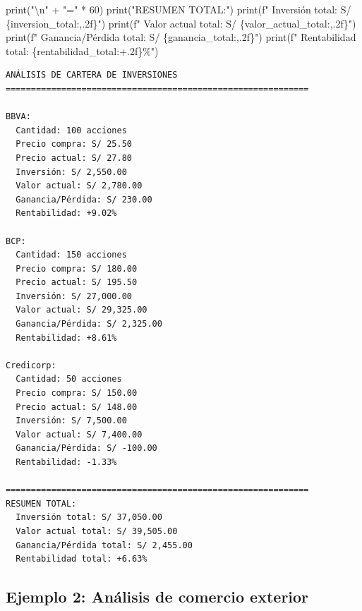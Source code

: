 \documentclass[
  doc,
  floatsintext,
  longtable,
  a4paper,
  nolmodern,
  notxfonts,
  notimes,
  12pt,
  colorlinks=true,linkcolor=blue,citecolor=blue,urlcolor=blue]{apa7}
\newenvironment{Shaded}{\begin{snugshade}}{\end{snugshade}}
\newcommand{\BuiltInTok}[1]{\textcolor[rgb]{0.00,0.23,0.31}{#1}}
\newcommand{\CharTok}[1]{\textcolor[rgb]{0.13,0.47,0.30}{#1}}
\newcommand{\DecValTok}[1]{\textcolor[rgb]{0.68,0.00,0.00}{#1}}
\newcommand{\NormalTok}[1]{\textcolor[rgb]{0.00,0.23,0.31}{#1}}
\newcommand{\OperatorTok}[1]{\textcolor[rgb]{0.37,0.37,0.37}{#1}}
\newcommand{\SpecialCharTok}[1]{\textcolor[rgb]{0.37,0.37,0.37}{#1}}
\newcommand{\SpecialStringTok}[1]{\textcolor[rgb]{0.13,0.47,0.30}{#1}}
\newcommand{\StringTok}[1]{\textcolor[rgb]{0.13,0.47,0.30}{#1}}
\begin{document}
\begin{Shaded}
\begin{Highlighting}[]
\BuiltInTok{print}\NormalTok{(}\StringTok{"}\CharTok{\textbackslash{}n}\StringTok{"} \OperatorTok{+} \StringTok{"="} \OperatorTok{*} \DecValTok{60}\NormalTok{)}
\BuiltInTok{print}\NormalTok{(}\StringTok{"RESUMEN TOTAL:"}\NormalTok{)}
\BuiltInTok{print}\NormalTok{(}\SpecialStringTok{f"  Inversión total: S/ }\SpecialCharTok{\{}\NormalTok{inversion\_total}\SpecialCharTok{:,.2f\}}\SpecialStringTok{"}\NormalTok{)}
\BuiltInTok{print}\NormalTok{(}\SpecialStringTok{f"  Valor actual total: S/ }\SpecialCharTok{\{}\NormalTok{valor\_actual\_total}\SpecialCharTok{:,.2f\}}\SpecialStringTok{"}\NormalTok{)}
\BuiltInTok{print}\NormalTok{(}\SpecialStringTok{f"  Ganancia/Pérdida total: S/ }\SpecialCharTok{\{}\NormalTok{ganancia\_total}\SpecialCharTok{:,.2f\}}\SpecialStringTok{"}\NormalTok{)}
\BuiltInTok{print}\NormalTok{(}\SpecialStringTok{f"  Rentabilidad total: }\SpecialCharTok{\{}\NormalTok{rentabilidad\_total}\SpecialCharTok{:+.2f\}}\SpecialStringTok{\%"}\NormalTok{)}
\end{Highlighting}
\end{Shaded}

\begin{verbatim}
ANÁLISIS DE CARTERA DE INVERSIONES
============================================================

BBVA:
  Cantidad: 100 acciones
  Precio compra: S/ 25.50
  Precio actual: S/ 27.80
  Inversión: S/ 2,550.00
  Valor actual: S/ 2,780.00
  Ganancia/Pérdida: S/ 230.00
  Rentabilidad: +9.02%

BCP:
  Cantidad: 150 acciones
  Precio compra: S/ 180.00
  Precio actual: S/ 195.50
  Inversión: S/ 27,000.00
  Valor actual: S/ 29,325.00
  Ganancia/Pérdida: S/ 2,325.00
  Rentabilidad: +8.61%

Credicorp:
  Cantidad: 50 acciones
  Precio compra: S/ 150.00
  Precio actual: S/ 148.00
  Inversión: S/ 7,500.00
  Valor actual: S/ 7,400.00
  Ganancia/Pérdida: S/ -100.00
  Rentabilidad: -1.33%

============================================================
RESUMEN TOTAL:
  Inversión total: S/ 37,050.00
  Valor actual total: S/ 39,505.00
  Ganancia/Pérdida total: S/ 2,455.00
  Rentabilidad total: +6.63%
\end{verbatim}

\subsection{Ejemplo 2: Análisis de comercio
exterior}\label{ejemplo-2-anuxe1lisis-de-comercio-exterior}
\end{document}
